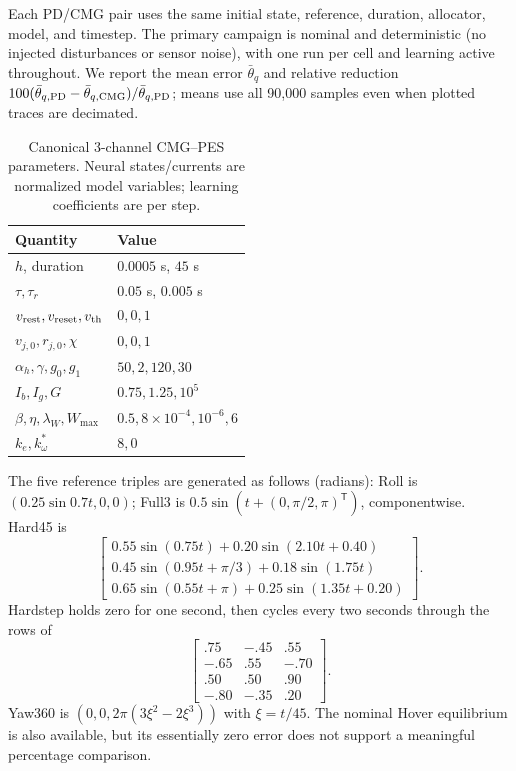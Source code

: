 \documentclass[letterpaper, 10 pt, conference]{ieeeconf}
\newcommand{\T}{^{\mathsf T}}
\begin{document}
Each PD/CMG pair uses the same initial state, reference, duration, allocator, model, and timestep. The primary campaign is nominal and deterministic (no injected disturbances or sensor noise), with one run per cell and learning active throughout. We report the mean error $\bar\theta_q$ and relative reduction $100(\bar\theta_{q,\rm PD}-\bar\theta_{q,\rm CMG})/\bar\theta_{q,\rm PD}$; means use all 90{,}000 samples even when plotted traces are decimated.

\begin{table}[h]
\caption{Canonical 3-channel CMG--PES parameters. Neural states/currents
are normalized model variables; learning coefficients are per step.}
\label{tab:parameters}\centering\small
\begin{tabular}{ll}
\toprule
Quantity & Value\\\midrule
$h$, duration & $0.0005$ s, $45$ s\\
$\tau,\tau_r$ & $0.05$ s, $0.005$ s\\
$v_{\rm rest},v_{\rm reset},v_{\rm th}$ & $0,0,1$\\
$v_{j,0},r_{j,0},\chi$ & $0,0,1$\\
$\alpha_h,\gamma,g_0,g_1$ & $50,2,120,30$\\
$I_b,I_g,G$ & $0.75,1.25,10^5$\\
$\beta,\eta,\lambda_W,W_{\max}$ & $0.5,8\times10^{-4},10^{-6},6$\\
$k_e,k_\omega^*$ & $8,0$\\
\bottomrule
\end{tabular}
\end{table}

The five reference triples are generated as follows (radians):
Roll is $(0.25\sin0.7t,0,0)$; Full3 is
$0.5\sin(t+(0,\pi/2,\pi)\T)$, componentwise. Hard45 is
\begin{equation}
 \begin{bmatrix}
 0.55\sin(0.75t)+0.20\sin(2.10t+0.40)\\
 0.45\sin(0.95t+\pi/3)+0.18\sin(1.75t)\\
 0.65\sin(0.55t+\pi)+0.25\sin(1.35t+0.20)
 \end{bmatrix}.
\end{equation}
Hardstep holds zero for one second, then cycles every two seconds through
the rows of
\begin{equation}
 \begin{bmatrix}
 .75&-.45&.55\\-.65&.55&-.70\\.50&.50&.90\\-.80&-.35&.20
 \end{bmatrix}.
\end{equation}
Yaw360 is $(0,0,2\pi(3\xi^2-2\xi^3))$ with $\xi=t/45$.
The nominal Hover equilibrium is also available, but its essentially zero
error does not support a meaningful percentage comparison.
\end{document}
